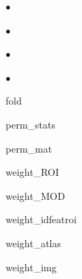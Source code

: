 \begin{list}{$\bullet$}
\begin{list}{$\bullet$}
\begin{list}{$\bullet$}
\begin{list}{$\bullet$}
	{\setlength{\labelsep}{.2cm}\setlength{\itemindent}{0cm}\setlength{\leftmargin}{1.7cm}}
\item fold
\item perm\_stats
\item perm\_mat
\end{list}
\item weight\_ROI
\item weight\_MOD
\item weight\_idfeatroi
\item weight\_atlas
\item weight\_img
\end{list}
\end{list}
\end{list}
